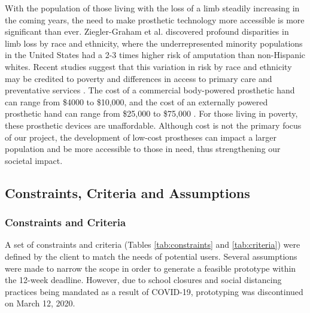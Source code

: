 \documentclass[11.5pt]{article}
\begin{document}
With the population of those living with the loss of a limb steadily increasing in the coming years, the need to make prosthetic technology more accessible is more significant than ever. Ziegler-Graham et al. discovered profound disparities in limb loss by race and ethnicity, where the underrepresented minority populations in the United States had a 2-3 times higher risk of amputation than non-Hispanic whites. Recent studies suggest that this variation in risk by race and ethnicity may be credited to poverty and differences in access to primary care and preventative services \cite{Ziegler-Graham2008-cx, Hughes2019-hy}. The cost of a commercial body-powered prosthetic hand can range from \$4000 to \$10,000, and the cost of an externally powered prosthetic hand can range from \$25,000 to \$75,000 \cite{Ten_Kate2017-sf}. For those living in poverty, these prosthetic devices are unaffordable. Although cost is not the primary focus of our project, the development of low-cost prostheses can impact a larger population and be more accessible to those in need, thus strengthening our societal impact.

\newpage
\subsection{Constraints, Criteria and Assumptions}
\subsubsection{Constraints and Criteria}

A set of constraints and criteria (Tables \ref{tab:constraints} and \ref{tab:criteria})  were defined by the client to match the needs of potential users. Several assumptions were made to narrow the scope in order to generate a feasible prototype within the 12-week deadline. However, due to school closures and social distancing practices being mandated as a result of COVID-19, prototyping was discontinued on March 12, 2020.
\end{document}
